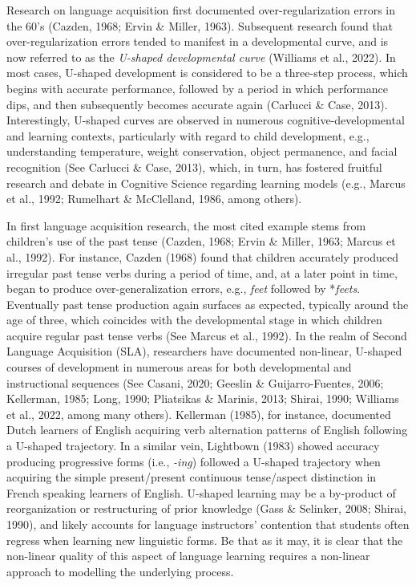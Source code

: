 \documentclass[
  letterpaper,
  DIV=11,
  numbers=noendperiod]{scrartcl}
\begin{document}
Research on language acquisition first documented over-regularization
errors in the 60's (Cazden, 1968; Ervin \& Miller, 1963). Subsequent
research found that over-regularization errors tended to manifest in a
developmental curve, and is now referred to as the \emph{U-shaped
developmental curve} (Williams et al., 2022). In most cases, U-shaped
development is considered to be a three-step process, which begins with
accurate performance, followed by a period in which performance dips,
and then subsequently becomes accurate again (Carlucci \& Case, 2013).
Interestingly, U-shaped curves are observed in numerous
cognitive-developmental and learning contexts, particularly with regard
to child development, e.g., understanding temperature, weight
conservation, object permanence, and facial recognition (See Carlucci \&
Case, 2013), which, in turn, has fostered fruitful research and debate
in Cognitive Science regarding learning models (e.g., Marcus et al.,
1992; Rumelhart \& McClelland, 1986, among others).

In first language acquisition research, the most cited example stems
from children's use of the past tense (Cazden, 1968; Ervin \& Miller,
1963; Marcus et al., 1992). For instance, Cazden (1968) found that
children accurately produced irregular past tense verbs during a period
of time, and, at a later point in time, began to produce
over-generalization errors, e.g., \emph{feet} followed by *\emph{feets}.
Eventually past tense production again surfaces as expected, typically
around the age of three, which coincides with the developmental stage in
which children acquire regular past tense verbs (See Marcus et al.,
1992). In the realm of Second Language Acquisition (SLA), researchers
have documented non-linear, U-shaped courses of development in numerous
areas for both developmental and instructional sequences (See Casani,
2020; Geeslin \& Guijarro-Fuentes, 2006; Kellerman, 1985; Long, 1990;
Pliatsikas \& Marinis, 2013; Shirai, 1990; Williams et al., 2022, among
many others). Kellerman (1985), for instance, documented Dutch learners
of English acquiring verb alternation patterns of English following a
U-shaped trajectory. In a similar vein, Lightbown (1983) showed accuracy
producing progressive forms (i.e., \emph{-ing}) followed a U-shaped
trajectory when acquiring the simple present/present continuous
tense/aspect distinction in French speaking learners of English.
U-shaped learning may be a by-product of reorganization or restructuring
of prior knowledge (Gass \& Selinker, 2008; Shirai, 1990), and likely
accounts for language instructors' contention that students often
regress when learning new linguistic forms. Be that as it may, it is
clear that the non-linear quality of this aspect of language learning
requires a non-linear approach to modelling the underlying process.
\end{document}
